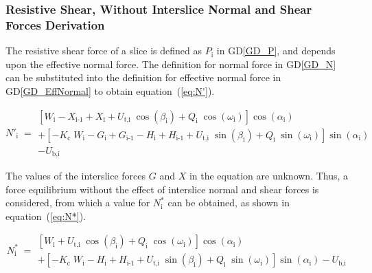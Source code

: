 \documentclass[12pt]{article}
\newcommand{\dref}[1]{GD\ref{#1}}
\begin{document}

\subsubsection*{Resistive Shear, Without Interslice Normal and Shear Forces 
Derivation}

\noindent
The resistive shear force of a slice is defined as $P_\text{i}$ in
\dref{GD_P}, and depends upon the effective normal force.  The definition for 
normal force in \dref{GD_N} can be substituted into the definition for 
effective normal force in \dref{GD_EffNormal} to obtain equation~(\ref{eq:N'}).

\begin{equation} \label{eq:N'}
 N'_{\text{i}} \; = \begin{array}{l}
   \left[ W_{\text{i}} - X_{\text{i-1}} + X_{\text{i}} +
     {U_{\text{t,i}}}\;{\cos\left(\beta_{\text{i}}\right)} +
     Q_{\text{i}}\;{\cos\left(\omega_{\text{i}}\right)}
     \right]\cos\left(\alpha_{\text{i}}\right) \\ + \left[
     {-K_{\text{c}}}\;{W_{\text{i}}} - G_{\text{i}} + G_{\text{i-1}} -
     H_{\text{i}} + H_{\text{i-1}} +
     {U_{\text{t,i}}}\;{\sin\left(\beta_{\text{i}}\right)} +
     Q_{\text{i}}\;{\sin\left(\omega_{\text{i}}\right)}
     \right]\sin\left(\alpha_{\text{i}}\right) \\ -
   U_{\text{b,i}} \end{array}
 \end{equation}

\noindent
The values of the interslice forces $G$ and $X$ in the equation are
unknown. Thus, a force equilibrium without the effect of interslice normal and 
shear forces is considered, from which a value for $N^*_\text{i}$ can be 
obtained, as shown in equation~(\ref{eq:N*}).

\begin{equation} \label{eq:N*}
 N^*_{\text{i}} \; = \begin{array}{l}
   \left[ W_{\text{i}} +
     {U_{\text{t,i}}}\;{\cos\left(\beta_{\text{i}}\right)} +
     Q_{\text{i}}\;{\cos\left(\omega_{\text{i}}\right)}
     \right]\cos\left(\alpha_{\text{i}}\right) \\ + \left[
     {-K_{\text{c}}}\;{W_{\text{i}}}- H_{\text{i}} + H_{\text{i-1}} +
     {U_{\text{t,i}}}\;{\sin\left(\beta_{\text{i}}\right)} +
     Q_{\text{i}}\;{\sin\left(\omega_{\text{i}}\right)}
     \right]\sin\left(\alpha_{\text{i}}\right) -
   U_{\text{b,i}} \end{array}
\end{equation}
\end{document}
